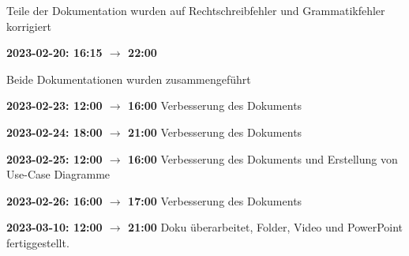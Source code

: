 Teile der Dokumentation wurden auf Rechtschreibfehler und Grammatikfehler korrigiert

\vspace{0.5cm} \textbf{2023-02-20: 16:15 $\rightarrow$ 22:00} 

Beide Dokumentationen wurden zusammengef\"uhrt



\vspace{0.5cm} \textbf{2023-02-23: 12:00 $\rightarrow$ 16:00} 
Verbesserung des Dokuments

\vspace{0.5cm} \textbf{2023-02-24: 18:00 $\rightarrow$ 21:00} 
Verbesserung des Dokuments

\vspace{0.5cm} \textbf{2023-02-25: 12:00 $\rightarrow$ 16:00} 
Verbesserung des Dokuments und Erstellung von Use-Case Diagramme

\vspace{0.5cm} \textbf{2023-02-26: 16:00 $\rightarrow$ 17:00} 
Verbesserung des Dokuments

\vspace{0.5cm} \textbf{2023-03-10: 12:00 $\rightarrow$ 21:00} 
Doku überarbeitet, Folder, Video und PowerPoint fertiggestellt.